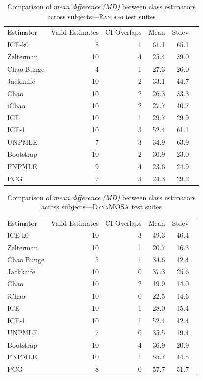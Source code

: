 \documentclass[sigconf,review,anonymous]{acmart}
\newcommand{\ICEallrare}{ICE-k0\xspace}
\newcommand{\Zelterman}{Zelterman\xspace}
\newcommand{\ChaoBunge}{Chao Bunge\xspace}
\newcommand{\Jackknife}{Jackknife\xspace}
\newcommand{\Chao}{Chao\xspace}
\newcommand{\improvedChao}{iChao\xspace}
\newcommand{\ICE}{ICE\xspace}
\newcommand{\improvedICE}{ICE-1\xspace}
\newcommand{\Unpmle}{UNPMLE\xspace}
\newcommand{\Bootstrap}{Bootstrap\xspace}
\newcommand{\Pnpmle}{PNPMLE\xspace}
\newcommand{\PCG}{PCG\xspace}
\newcommand{\EvosuiteRandom}{\textsc{Random}\xspace}
\newcommand{\EvosuiteDynamosa}{\textsc{DynaMOSA}\xspace}
\begin{document}
\begin{table}[t]
\caption{Comparison of \emph{mean difference (MD)} between class
estimators across subjects---\EvosuiteRandom test suites}
\begin{tabular}{|l|r|r|r|r|r|}
Estimator	&Valid Estimates	&CI Overlaps	&Mean	&Stdev	\\
\ICEallrare	&	8	&	1	&61.1	&	65.1\\
\Zelterman	&	10	&	4	&25.4	&	39.0\\
\ChaoBunge	&	4	&	1	&27.3	&	26.0\\
\Jackknife	&	10	&	2	&33.1	&	44.7\\
\Chao	&	10	&	2	&26.3	&	33.3\\
\improvedChao	&	10	&	2	&27.7	&	40.7\\
\ICE	&	10	&	1	&29.7	&	29.9\\
\improvedICE	&	10	&	3	&52.4	&	61.1\\
\Unpmle	&	7	&	3	&34.9	&	63.9\\
\Bootstrap	&	10	&	2	&30.9	&	23.0\\
\Pnpmle	&	9	&	4	&23.6	&	24.9\\
\PCG	&	7	&	3	&24.3	&	29.2\\
\end{tabular}
\label{tbl:estrandomclass}
\end{table}
\begin{table}[t]
\caption{Comparison of \emph{mean difference (MD)} between class
estimators across subjects---\EvosuiteDynamosa test suites}
\begin{tabular}{|l|r|r|r|r|r|}
Estimator	&Valid Estimates	&CI Overlaps	&Mean	&Stdev	\\
\ICEallrare	&	10	&	3	&49.3	&	46.4\\
\Zelterman	&	10	&	1	&20.7	&	16.3\\
\ChaoBunge	&	5	&	1	&34.6	&	42.4\\
\Jackknife	&	10	&	0	&37.3	&	25.6\\
\Chao	&	10	&	2	&19.9	&	14.0\\
\improvedChao	&	10	&	0	&22.5	&	14.6\\
\ICE	&	10	&	1	&28.0	&	15.4\\
\improvedICE	&	10	&	1	&52.4	&	42.4\\
\Unpmle	&	7	&	0	&35.5	&	19.4\\
\Bootstrap	&	10	&	4	&36.9	&	20.9\\
\Pnpmle	&	10	&	1	&55.7	&	44.5\\
\PCG	&	8	&	0	&57.7	&	51.7\\
\end{tabular}
\label{tbl:estdynamosaclass}
\end{table}
\end{document}

